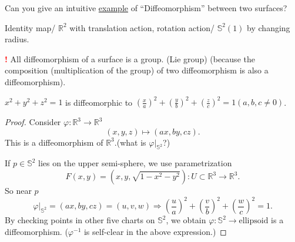 \begin{question}
    Can you give an intuitive \underline{example} of ``Diffeomorphism''
    between two surfaces?
\end{question}
\begin{example}
    Identity map/ $\mathbb{R}^2$ with translation action, rotation action/
    $\mathbb{S}^2(1)$ by changing radius.
\end{example}
{\Large\textcolor{red}{\textbf{!}}} {All diffeomorphism of a surface}
is a group. (Lie group) (because the composition (multiplication of the group)
of two diffeomorphism is also a diffeomorphism).
\begin{example}
    ${x^2+y^2+z^2=1}$ is diffeomorphic to ${\left(\frac{x}{a}\right)^2
                +\left(\frac{y}{b}\right)^2+\left(\frac{z}{c}\right)^2=1}(a,b,c\neq 0)$.
\end{example}
\begin{proof}
    Consider $\varphi \colon \mathbb{R}^3\to \mathbb{R}^3$
    \[
        (x,y,z)\mapsto (ax,by,cz).
    \]
    This is a diffeomorphism of $\mathbb{R}^3$.(what is $\varphi|_{\mathbb{S}^2}$?)

    If $p\in \mathbb{S}^2$ lies on the upper semi-sphere, we use
    parametrization
    \[
        F(x,y)=(x,y,\sqrt{1-x^2-y^2})\colon U\subset \mathbb{R}^3\to \mathbb
        {R}^3    .
    \]
    So near $p$
    \[
        \varphi|_{\mathbb{S}^2}=(ax,by,cz)=(u,v,w)\Rightarrow
        \left(\frac{u}{a}\right)^2
        +\left(\frac{v}{b}\right)^2+\left(\frac{w}{c}\right)^2=1
        .\]
    By checking points in other five charts on $\mathbb{S}^2$, we obtain $\varphi\colon \mathbb{S}^2\to \text{ellipsoid}$ is a diffeomorphism. ($\varphi^{-1}$ is self-clear in the above expression.)
\end{proof}
